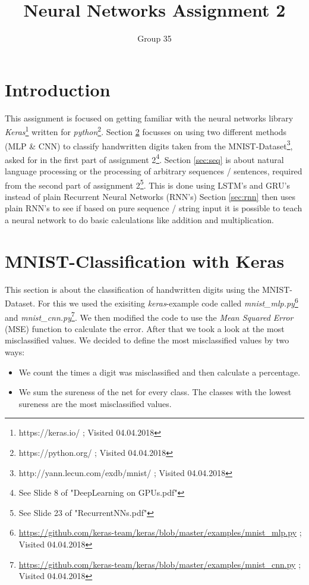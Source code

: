 \documentclass{article}
\begin{document}
\title{Neural Networks Assignment 2}
\author{Group 35}
\maketitle
\lstset{
  basicstyle=\ttfamily,
  keywordstyle=\bfseries,
  language=Java,
  frame=single,
  aboveskip=11pt,
  belowskip=11pt,
  breaklines=true,
  breakatwhitespace=false,
  showspaces=false,
  showstringspaces=false,
  numbers=left,
  stepnumber=1,    
  firstnumber=1,
  numberfirstline=true
}

\section{Introduction}
This assignment is focused on getting familiar with the neural networks library \textit{Keras}\footnote{https://keras.io/ ; Visited 04.04.2018} written for \textit{python}\footnote{https://python.org/ ; Visited 04.04.2018}.
Section \ref{sec:mnist} focusses on using two different methods (MLP \& CNN) to classify handwritten digits taken from the MNIST-Dataset\footnote{http://yann.lecun.com/exdb/mnist/ ; Visited 04.04.2018}, asked for in the first part of assignment 2\footnote{See Slide 8 of "DeepLearning on GPUs.pdf"}.
Section \ref{sec:seq} is about natural language processing or the processing of arbitrary sequences / sentences,  required from the second part of assignment 2\footnote{See Slide 23 of "RecurrentNNs.pdf"}. This is done using LSTM's and GRU's instead of plain Recurrent Neural Networks (RNN's)
Section \ref{sec:rnn} then uses plain RNN's to see if based on pure sequence / string input it is possible to teach a neural network to do basic calculations like addition and multiplication.

\section{MNIST-Classification with Keras}
\label{sec:mnist}
This section is about the classification of handwritten digits using the MNIST-Dataset.
For this we used the exisiting \textit{keras}-example code called \textit{mnist\_mlp.py}\footnote{\url{https://github.com/keras-team/keras/blob/master/examples/mnist_mlp.py} ; Visited 04.04.2018} and \textit{mnist\_cnn.py}\footnote{\url{https://github.com/keras-team/keras/blob/master/examples/mnist_cnn.py} ; Visited 04.04.2018}. We then modified the code to use the \emph{Mean Squared Error} (MSE) function to calculate the error.
After that we took a look at the most misclassified values.
We decided to define the most misclassified values by two ways:
\begin{itemize}
	\item We count the times a digit was misclassified and then calculate a percentage.
	\item We sum the sureness of the net for every class. The classes with the lowest sureness are the most misclassified values.
\end{itemize}
\end{document}

